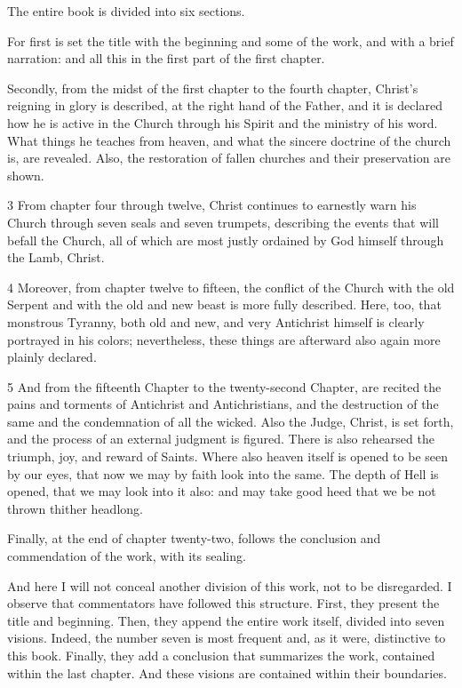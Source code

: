 The entire book is divided into six sections.

For first is set the title with the beginning and some of the work, and with a brief narration: and all this in the first part of the first chapter.

Secondly, from the midst of the first chapter to the fourth chapter, Christ’s reigning in glory is described, at the right hand of the Father, and it is declared how he is active in the Church through his Spirit and the ministry of his word. What things he teaches from heaven, and what the sincere doctrine of the church is, are revealed. Also, the restoration of fallen churches and their preservation are shown.

3 From chapter four through twelve, Christ continues to earnestly warn his Church through seven seals and seven trumpets, describing the events that will befall the Church, all of which are most justly ordained by God himself through the Lamb, Christ.

4 Moreover, from chapter twelve to fifteen, the conflict of the Church with the old Serpent and with the old and new beast is more fully described. Here, too, that monstrous Tyranny, both old and new, and very Antichrist himself is clearly portrayed in his colors; nevertheless, these things are afterward also again more plainly declared.

5 And from the fifteenth Chapter to the twenty-second Chapter, are recited the pains and torments of Antichrist and Antichristians, and the destruction of the same and the condemnation of all the wicked. Also the Judge, Christ, is set forth, and the process of an external judgment is figured. There is also rehearsed the triumph, joy, and reward of Saints. Where also heaven itself is opened to be seen by our eyes, that now we may by faith look into the same. The depth of Hell is opened, that we may look into it also: and may take good heed that we be not thrown thither headlong.

Finally, at the end of chapter twenty-two, follows the conclusion and commendation of the work, with its sealing.

And here I will not conceal another division of this work, not to be disregarded. I observe that commentators have followed this structure. First, they present the title and beginning. Then, they append the entire work itself, divided into seven visions. Indeed, the number seven is most frequent and, as it were, distinctive to this book. Finally, they add a conclusion that summarizes the work, contained within the last chapter. And these visions are contained within their boundaries.

